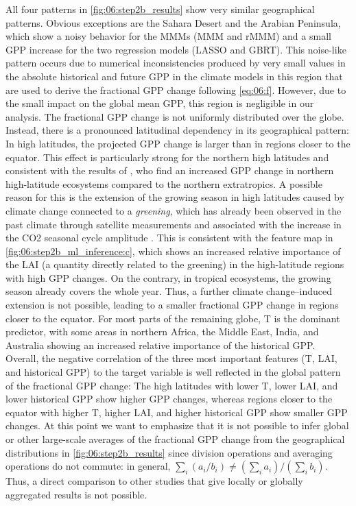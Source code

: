 All four patterns in \cref{fig:06:step2b_results} show very similar
geographical patterns. Obvious exceptions are the Sahara Desert and the Arabian
Peninsula, which show a noisy behavior for the \aclp{MMM} (\ac{MMM} and
r\acs{MMM}) and a small \ac{GPP} increase for the two regression models
(\ac{LASSO} and \ac{GBRT}). This noise-like pattern occurs due to numerical
inconsistencies produced by very small values in the absolute historical and
future \ac{GPP} in the climate models in this region that are used to derive
the fractional \ac{GPP} change following \cref{eq:06:f}. However, due to the
small impact on the global mean \ac{GPP}, this region is negligible in our
analysis. The fractional \ac{GPP} change is not uniformly distributed over the
globe. Instead, there is a pronounced latitudinal dependency in its
geographical pattern: In high latitudes, the projected \ac{GPP} change is
larger than in regions closer to the equator. This effect is particularly
strong for the northern high latitudes and consistent with the results of
\textcite{Wenzel2016}, who find an increased \ac{GPP} change in northern
high-latitude ecosystems compared to the northern extratropics. A possible
reason for this is the extension of the growing season in high latitudes caused
by climate change connected to a \emph{greening}, which has already been
observed in the past climate through satellite measurements
\autocite{Lucht2002, Myneni1997, Zhang2020} and associated with the increase in
the \ac{CO2} seasonal cycle amplitude \autocite{Forkel2016}. This is consistent
with the feature map in \cref{fig:06:step2b_ml_inference:c}, which shows an
increased relative importance of the \ac{LAI} (a quantity directly related to
the greening) in the high-latitude regions with high \ac{GPP} changes. On the
contrary, in tropical ecosystems, the growing season already covers the whole
year. Thus, a further climate change--induced extension is not possible,
leading to a smaller fractional \ac{GPP} change in regions closer to the
equator. For most parts of the remaining globe, \ac{T} is the dominant
predictor, with some areas in northern Africa, the Middle East, India, and
Australia showing an increased relative importance of the historical \ac{GPP}.
Overall, the negative correlation of the three most important features (\ac{T},
\ac{LAI}, and historical \ac{GPP}) to the target variable is well reflected in
the global pattern of the fractional \ac{GPP} change: The high latitudes with
lower \ac{T}, lower \ac{LAI}, and lower historical \ac{GPP} show higher
\ac{GPP} changes, whereas regions closer to the equator with higher \ac{T},
higher \ac{LAI}, and higher historical \ac{GPP} show smaller \ac{GPP} changes.
At this point we want to emphasize that it is not possible to infer global or
other large-scale averages of the fractional \ac{GPP} change from the
geographical distributions in \cref{fig:06:step2b_results} since division
operations and averaging operations do not commute: in general, $\sum_i \left(
a_i / b_i \right) \neq \left( \sum_i a_i \right) / \left( \sum_i b_i \right)$.
Thus, a direct comparison to other studies that give locally or globally
aggregated results is not possible.

